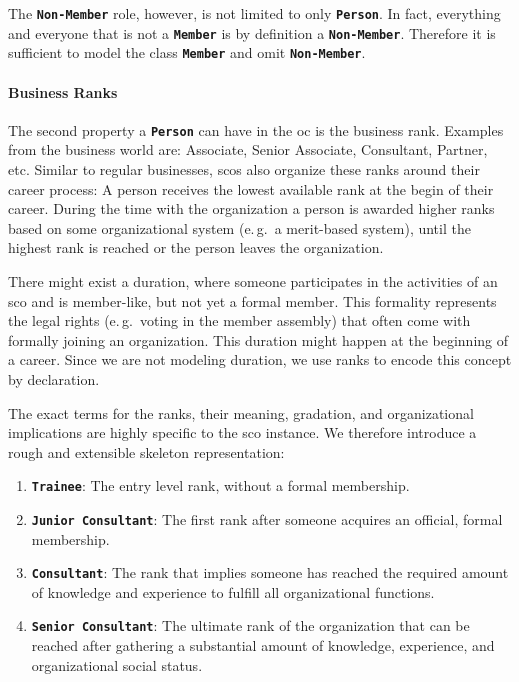 \documentclass[a4paper, DIV=13, BCOR=0cm]{scrbook}
\newcommand{\eg}{e.\,g.\ }
\newcommand{\class}[1]{\texttt{\textbf{#1}}}
\begin{document}
The \class{Non-Member} role, however, is not limited to only \class{Person}. In fact, everything and everyone that is not a \class{Member} is by definition a \class{Non-Member}. Therefore it is sufficient to model the class \class{Member} and omit \class{Non-Member}.

\paragraph{Business Ranks}
\label{ranks}
The second property a \class{Person} can have in the \gls{oc} is the business rank. Examples from the business world are: Associate, Senior Associate, Consultant, Partner, etc. Similar to regular businesses, \glspl{sco} also organize these ranks around their career process: A person receives the lowest available rank at the begin of their career. During the time with the organization a person is awarded higher ranks based on some organizational system (\eg a merit-based system), until the highest rank is reached or the person leaves the organization.

There might exist a duration, where someone participates in the activities of an \gls{sco} and is member-like, but not yet a formal member. This formality represents the legal rights (\eg voting in the member assembly) that often come with formally joining an organization. This duration might happen at the beginning of a career. Since we are not modeling duration, we use ranks to encode this concept by declaration.

The exact terms for the ranks, their meaning, gradation, and organizational implications are highly specific to the \gls{sco} instance. We therefore introduce a rough and extensible skeleton representation:
\begin{enumerate}
	\item \class{Trainee}: The entry level rank, without a formal membership.
	\item \class{Junior Consultant}: The first rank after someone acquires an official, formal membership.
	\item \class{Consultant}: The rank that implies someone has reached the required amount of knowledge and experience to fulfill all organizational functions.
	\item \class{Senior Consultant}: The ultimate rank of the organization that can be reached after gathering a substantial amount of knowledge, experience, and organizational social status.
\end{enumerate}
\end{document}

